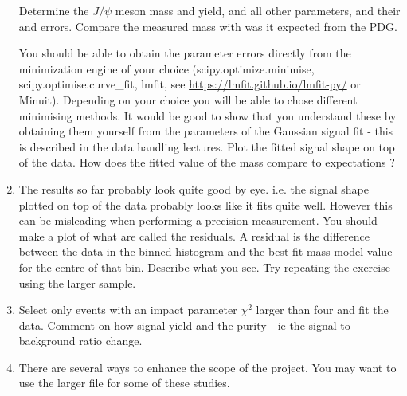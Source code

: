 \begin{enumerate}
Determine the $J/\psi$  meson mass and yield, and all other parameters, and their and errors. Compare the measured mass with was it expected from the PDG.

You should be able to obtain the parameter errors directly from the minimization engine of your choice (scipy.optimize.minimise, scipy.optimise.curve\_fit, lmfit, see \url{https://lmfit.github.io/lmfit-py/} or Minuit). Depending on your choice you will be able to chose different minimising methods.
It would be good to show that you understand these by obtaining them yourself from the parameters of the Gaussian signal fit - this is described in the data handling lectures. Plot the fitted signal shape on top of the data. How does the fitted value of the mass compare to expectations ? 

\item The results so far probably look quite good by eye. i.e. the signal shape plotted on
top of the data probably looks like it fits quite well. However this can be misleading
when performing a precision measurement. You should make a plot of what are called
the residuals. A residual is the difference between the data in the binned histogram
and the best-fit mass model value for the centre of that bin. Describe what you see. Try repeating the exercise using the larger sample.

\item Select only events with an impact parameter $\chi^2$ larger than four and fit the data. Comment on how signal yield and the purity - ie the signal-to-background ratio change.

\item There are several ways to enhance the scope of the project. You may want to use the larger file for some of these studies.


\end{enumerate}
